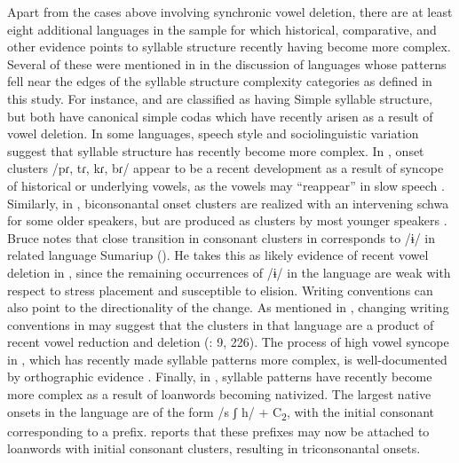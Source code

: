   Apart from the cases above involving synchronic vowel deletion, there are at least eight additional languages in the sample for which historical, comparative, and other evidence points to syllable structure recently having become more complex. Several of these were mentioned in  in the discussion of languages whose patterns fell near the edges of the syllable structure complexity categories as defined in this study. For instance,  and  are classified as having Simple syllable structure, but both have canonical simple codas which have recently arisen as a result of vowel deletion. In some languages, speech style and sociolinguistic variation suggest that syllable structure has recently become more complex. In , onset clusters /pɾ, tɾ, kɾ, bɾ/ appear to be a recent development as a result of syncope of historical or underlying vowels, as the vowels may “reappear” in slow speech \citep[20]{Holt1999}. Similarly, in , biconsonantal onset clusters are realized with an intervening schwa for some older speakers, but are produced as clusters by most younger speakers \citep[65--67]{Loughnane2009}. Bruce notes that close transition in consonant clusters in  corresponds to /ɨ/ in related language Sumariup (\citeyear[69--70]{Bruce1984}). He takes this as likely evidence of recent vowel deletion in , since the remaining occurrences of /ɨ/ in the language are weak with respect to stress placement and susceptible to elision. Writing conventions can also point to the directionality of the change. As mentioned in , changing writing conventions in  may suggest that the clusters in that language are a product of recent vowel reduction and deletion (\citealt{Whitehead2004}: 9, 226). The process of high vowel syncope in , which has recently made syllable patterns more complex, is well-documented by orthographic evidence \citep[36--38]{Haspelmath1993}. Finally, in , syllable patterns have recently become more complex as a result of loanwords becoming nativized. The largest native onsets in the language are of the form /s ʃ h/ + C\textsubscript{2}, with the initial consonant corresponding to a prefix. \citep[14]{Kaufman1971} reports that these prefixes may now be attached to  loanwords with initial consonant clusters, resulting in triconsonantal onsets.

